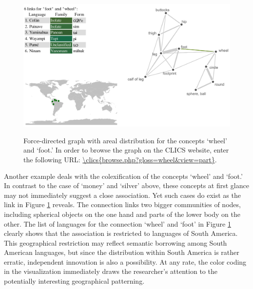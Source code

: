 \begin{figure}[htbp]
\begin{center}
    \href{\clics{browse.php?gloss=wheel&view=part}}{\includegraphics[width=\textwidth]{img/wheel-image.png}}
\caption{Force-directed graph with areal distribution for the concepts `wheel' and `foot.' In order
to browse the graph on the CLICS website, enter the following URL:
\url{\clics{browse.php?gloss=wheel&view=part}}.}
\label{WheelFootAreas}
\end{center}
\end{figure}


Another example deals with the colexification of the concepts `wheel' and `foot.' In contrast to the case of `money' and `silver' above, these concepts at first glance may not immediately suggest a close association. Yet such cases do exist as the link in Figure \ref{WheelFootAreas} reveals. The connection links two bigger communities of nodes, including spherical objects on the one hand and parts of the lower body on the other. The list of languages for the connection `wheel' and `foot' in Figure \ref{WheelFootAreas} clearly shows that the association is restricted to languages of South America. 
This geographical restriction may reflect semantic borrowing among South American languages, but since the distribution within South America is rather erratic, independent innovation is also a possibility. At any rate, the color coding in the visualization immediately draws the researcher's attention to the potentially interesting geographical patterning.



